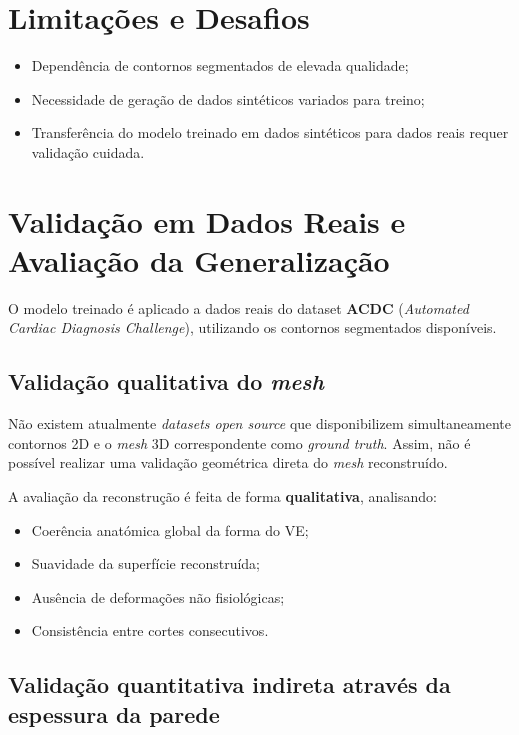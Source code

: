 \documentclass[12pt,a4paper]{report}
\begin{document}
\section{Limitações e Desafios}

\begin{itemize}
    \item Dependência de contornos segmentados de elevada qualidade;
    \item Necessidade de geração de dados sintéticos variados para treino;
    \item Transferência do modelo treinado em dados sintéticos para dados reais requer validação cuidada.
\end{itemize}

\section{Validação em Dados Reais e Avaliação da Generalização}

O modelo treinado é aplicado a dados reais do dataset \textbf{ACDC} (\textit{Automated Cardiac Diagnosis Challenge}), utilizando os contornos segmentados disponíveis.

\subsection*{Validação qualitativa do \textit{mesh}}

Não existem atualmente \textit{datasets open source} que disponibilizem simultaneamente contornos 2D e o \textit{mesh} 3D correspondente como \textit{ground truth}. Assim, não é possível realizar uma validação geométrica direta do \textit{mesh} reconstruído.

A avaliação da reconstrução é feita de forma \textbf{qualitativa}, analisando:

\begin{itemize}
    \item Coerência anatómica global da forma do VE;
    \item Suavidade da superfície reconstruída;
    \item Ausência de deformações não fisiológicas;
    \item Consistência entre cortes consecutivos.
\end{itemize}

\subsection*{Validação quantitativa indireta através da espessura da parede}
\end{document}
